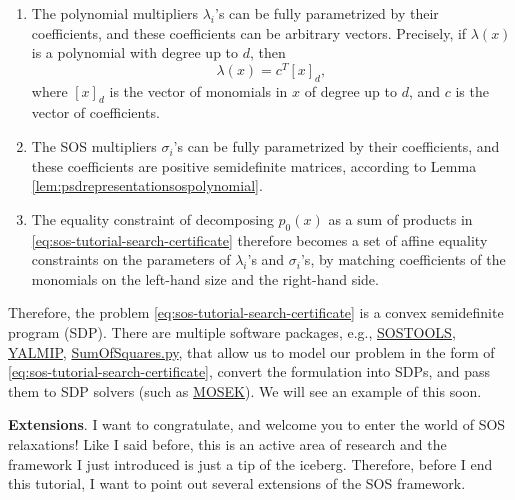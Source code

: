 \documentclass[
]{book}
\theoremstyle{definition}
\theoremstyle{definition}
\theoremstyle{definition}
\theoremstyle{definition}
\theoremstyle{remark}
\begin{document}
\begin{enumerate}
\def\labelenumi{\alph{enumi}.}
\item
  The polynomial multipliers \(\lambda_i\)'s can be fully parametrized by their coefficients, and these coefficients can be arbitrary vectors. Precisely, if \(\lambda(x)\) is a polynomial with degree up to \(d\), then
  \[
  \lambda(x) = c^T [x]_d,
  \]
  where \([x]_d\) is the vector of monomials in \(x\) of degree up to \(d\), and \(c\) is the vector of coefficients.
\item
  The SOS multipliers \(\sigma_i\)'s can be fully parametrized by their coefficients, and these coefficients are positive semidefinite matrices, according to Lemma \ref{lem:psdrepresentationsospolynomial}.
\item
  The equality constraint of decomposing \(p_0(x)\) as a sum of products in \eqref{eq:sos-tutorial-search-certificate} therefore becomes a set of affine equality constraints on the parameters of \(\lambda_i\)'s and \(\sigma_i\)'s, by matching coefficients of the monomials on the left-hand size and the right-hand side.
\end{enumerate}

Therefore, the problem \eqref{eq:sos-tutorial-search-certificate} is a convex semidefinite program (SDP). There are multiple software packages, e.g., \href{https://github.com/oxfordcontrol/SOSTOOLS}{SOSTOOLS}, \href{https://yalmip.github.io/}{YALMIP}, \href{https://github.com/yuanchenyang/SumOfSquares.py}{SumOfSquares.py}, that allow us to model our problem in the form of \eqref{eq:sos-tutorial-search-certificate}, convert the formulation into SDPs, and pass them to SDP solvers (such as \href{https://www.mosek.com/}{MOSEK}). We will see an example of this soon.

\textbf{Extensions}. I want to congratulate, and welcome you to enter the world of SOS relaxations! Like I said before, this is an active area of research and the framework I just introduced is just a tip of the iceberg. Therefore, before I end this tutorial, I want to point out several extensions of the SOS framework.
\end{document}
